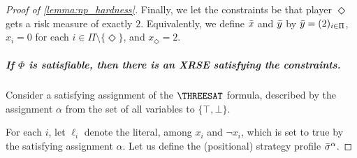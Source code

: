 \begin{proof}[Proof of \cref{lemma:np_hardness}]
Finally, we let the constraints be that player $\Diamond$ gets a risk measure of exactly $2$.
Equivalently, we define ${\bar{x}}$ and ${\bar{y}}$ by ${\bar{y}} = (2)_{i \in \Pi}$, $x_i = 0$ for each $i \in \Pi \setminus \{\Diamond\}$, and $x_\Diamond = 2$.





    \subparagraph*{If $\Phi$ is satisfiable, then there is an XRSE satisfying the constraints.}
    Consider a satisfying assignment of the $\THREESAT$ formula, described by the assignment $\alpha$ from the set of all variables to $\{\top,\bot\}$.
    
    For each $i$, let $\ell_i$ denote the literal, among $x_i$ and $\neg x_i$, which is set to true by 
    the satisfying assignment $\alpha$.
    Let us define the (positional) strategy profile ${\bar{\sigma}}^\alpha$.
    

\end{proof}
